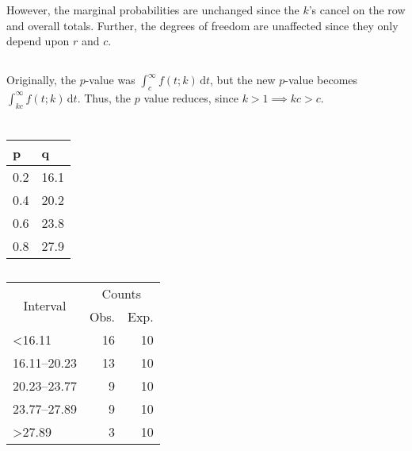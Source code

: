 \documentclass[twocolumn]{article}
\newcommand{\setsection}[1]{\setcounter{section}{#1}\addtocounter{section}{-1}\section{}}
\newcommand{\intg}[4]{\int_{#1}^{#2} \! #3 \, \mathrm{d}#4}
\begin{document}
However, the marginal probabilities are unchanged since the $k$'s cancel on the row and overall totals. Further, the degrees of freedom are unaffected since they only depend upon $r$ and $c$.

\subsection{}

Originally, the $p$-value was $\intg{c}{\infty}{f(t;k)}{t}$, but the new $p$-value becomes $\intg{kc}{\infty}{f(t;k)}{t}$. Thus, the $p$ value reduces, since $k>1\implies kc>c$.

\setsection{22}

\subsection{}

\begin{table}[!ht]
\centering
\begin{tabular}{@{}ll@{}}
\toprule
p   & q    \\ \midrule
0.2 & 16.1 \\
0.4 & 20.2 \\
0.6 & 23.8 \\
0.8 & 27.9 \\ \bottomrule
\end{tabular}
\end{table}

\newpage

\subsection{}
\begin{table}[!ht]
\centering
\begin{tabular}{@{}lrr@{}}
\toprule
\multicolumn{1}{c}{\multirow{2}{*}{Interval}} & \multicolumn{2}{c}{Counts}                          \\ \cmidrule(l){2-3} 
                                              & \multicolumn{1}{l}{Obs.} & \multicolumn{1}{l}{Exp.} \\ \midrule
\textless16.11                                & 16                       & 10                       \\
16.11--20.23                                  & 13                       & 10                       \\
20.23--23.77                                  & 9                        & 10                       \\
23.77--27.89                                  & 9                        & 10                       \\
\textgreater27.89                             & 3                        & 10                       \\ \bottomrule
\end{tabular}
\end{table}
\end{document}
